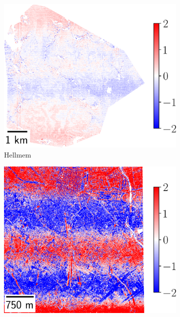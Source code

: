 \begin{figure}
    \begin{subfigure}[t]{0.48\linewidth}
        \flushleft
        \includegraphics[width=\linewidth]{Images/Chap_6/vibrations_Hellmem.png}
        \caption{Hellmem}
        \label{fig:vibrations_Hellmem}
    \end{subfigure}\hfill
    \begin{subfigure}[t]{0.48\linewidth}
        \flushright
        \includegraphics[width=\linewidth]{Images/Chap_6/vibrations_Montpellier.png}

\end{subfigure}
\end{figure}
